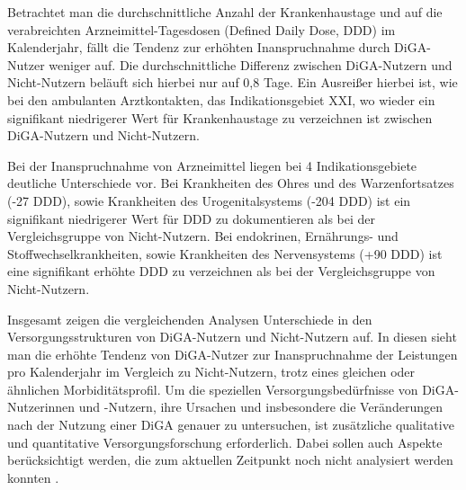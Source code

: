 \documentclass{article}
\begin{document}
			Betrachtet man die durchschnittliche Anzahl der Krankenhaustage und auf die verabreichten Arzneimittel-Tagesdosen (Defined Daily Dose, DDD) im Kalenderjahr, fällt die Tendenz zur erhöhten Inanspruchnahme durch DiGA-Nutzer weniger auf. Die durchschnittliche Differenz zwischen DiGA-Nutzern und Nicht-Nutzern beläuft sich hierbei nur auf 0,8 Tage. Ein Ausreißer hierbei ist, wie bei den ambulanten Arztkontakten, das Indikationsgebiet XXI, wo wieder ein signifikant niedrigerer Wert für Krankenhaustage zu verzeichnen ist zwischen DiGA-Nutzern und Nicht-Nutzern.\par
			Bei der Inanspruchnahme von Arzneimittel liegen bei 4 Indikationsgebiete deutliche Unterschiede vor. Bei Krankheiten des Ohres und des Warzenfortsatzes (-27 DDD), sowie Krankheiten des Urogenitalsystems (-204 DDD) ist ein signifikant niedrigerer Wert für DDD zu dokumentieren als bei der Vergleichsgruppe von Nicht-Nutzern. Bei endokrinen, Ernährungs- und Stoffwechselkrankheiten, sowie Krankheiten des Nervensystems (+90 DDD) ist eine signifikant erhöhte DDD zu verzeichnen als bei der Vergleichsgruppe von Nicht-Nutzern.\par
			Insgesamt zeigen die vergleichenden Analysen Unterschiede in den Versorgungsstrukturen von DiGA-Nutzern und Nicht-Nutzern auf. In diesen sieht man die erhöhte Tendenz von DiGA-Nutzer zur Inanspruchnahme der Leistungen pro Kalenderjahr im Vergleich zu Nicht-Nutzern, trotz eines gleichen oder ähnlichen Morbiditätsprofil. Um die speziellen Versorgungsbedürfnisse von DiGA-Nutzerinnen und -Nutzern, ihre Ursachen und insbesondere die Veränderungen nach der Nutzung einer DiGA genauer zu untersuchen, ist zusätzliche qualitative und quantitative Versorgungsforschung erforderlich. Dabei sollen auch Aspekte berücksichtigt werden, die zum aktuellen Zeitpunkt noch nicht analysiert werden konnten \cite[vgl. S.36]{TK-Report-2}.
			
\end{document}
